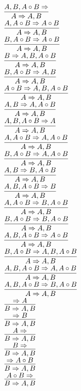 \documentclass[11pt]{article}
\begin{document}
\begin{center}
\bigskip
\\$\infer{A\Rightarrow A, B}{A, B, A\circ B\Rightarrow }$
\bigskip
\\$\infer{A\Rightarrow A, B}{A, A\circ B\Rightarrow A\circ B}$
\bigskip
\\$\infer{A\Rightarrow A, B}{B, A\circ B\Rightarrow A\circ B}$
\bigskip
\\$\infer{A\Rightarrow A, B}{B\Rightarrow A, B, A\circ B}$
\bigskip
\\$\infer{A\Rightarrow A, B}{B, A\circ B\Rightarrow A, B}$
\bigskip
\\$\infer{A\Rightarrow A, B}{A\circ B\Rightarrow A, B, A\circ B}$
\bigskip
\\$\infer{A\Rightarrow A, B}{A, B\Rightarrow A, A\circ B}$
\bigskip
\\$\infer{A\Rightarrow A, B}{A, B, A\circ B\Rightarrow A}$
\bigskip
\\$\infer{A\Rightarrow A, B}{A, A\circ B\Rightarrow A, A\circ B}$
\bigskip
\\$\infer{A\Rightarrow A, B}{B, A\circ B\Rightarrow A, A\circ B}$
\bigskip
\\$\infer{A\Rightarrow A, B}{A, B\Rightarrow B, A\circ B}$
\bigskip
\\$\infer{A\Rightarrow A, B}{A, B, A\circ B\Rightarrow B}$
\bigskip
\\$\infer{A\Rightarrow A, B}{A, A\circ B\Rightarrow B, A\circ B}$
\bigskip
\\$\infer{A\Rightarrow A, B}{B, A\circ B\Rightarrow B, A\circ B}$
\bigskip
\\$\infer{A\Rightarrow A, B}{A, B, A\circ B\Rightarrow A\circ B}$
\bigskip
\\$\infer{A\Rightarrow A, B}{B, A\circ B\Rightarrow A, B, A\circ B}$
\bigskip
\\$\infer{A\Rightarrow A, B}{A, B, A\circ B\Rightarrow A, A\circ B}$
\bigskip
\\$\infer{A\Rightarrow A, B}{A, B, A\circ B\Rightarrow B, A\circ B}$
\bigskip
\\$\infer{B\Rightarrow A, B}{\Rightarrow A}$
\bigskip
\\$\infer{B\Rightarrow A, B}{\Rightarrow B}$
\bigskip
\\$\infer{B\Rightarrow A, B}{A\Rightarrow }$
\bigskip
\\$\infer{B\Rightarrow A, B}{B\Rightarrow }$
\bigskip
\\$\infer{B\Rightarrow A, B}{\Rightarrow A\circ B}$
\bigskip
\\$\infer{B\Rightarrow A, B}{A\circ B\Rightarrow }$

\end{center}
\end{document}
